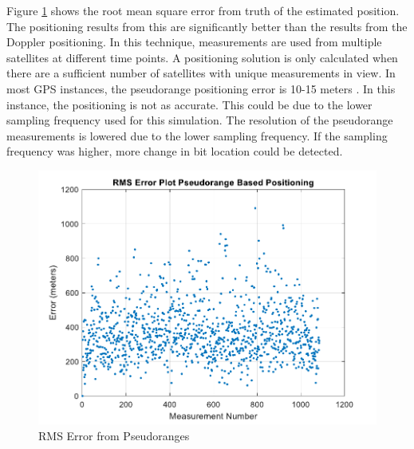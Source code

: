 \documentclass[12pt]{report}
\begin{document}
Figure \ref{fig:CleanPseudo15minIridRSME} shows the root mean square error from truth of the estimated position. The positioning results from this are significantly better than the results from the Doppler positioning. In this technique, measurements are used from multiple satellites at different time points. A positioning solution is only calculated when there are a sufficient number of satellites with unique measurements in view. In most GPS instances, the pseudorange positioning error is 10-15 meters \cite{misraGlobalPositioningSystem2012}. In this instance, the positioning is not as accurate. This could be due to the lower sampling frequency used for this simulation. The resolution of the pseudorange measurements is lowered due to the lower sampling frequency. If the sampling frequency was higher, more change in bit location could be detected. 
\begin{figure}[h!]
    \centering
    \includegraphics[width=5in]
    {15min_irid_clean_pseudo_rmse.pdf}
    \caption{RMS Error from Pseudoranges}
    \label{fig:CleanPseudo15minIridRSME}
\end{figure}
\end{document}
